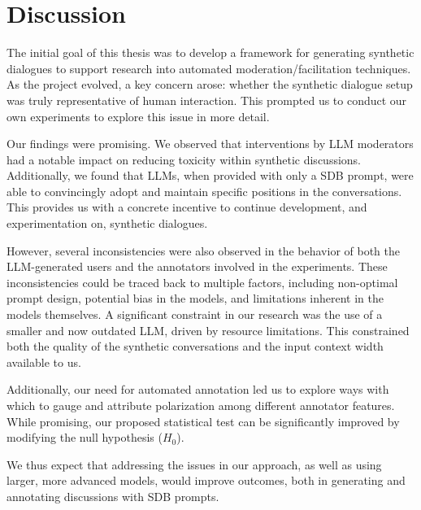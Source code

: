 %
\chapter{Discussion}
\label{sec:discusision}

The initial goal of this thesis was to develop a framework for generating synthetic dialogues to support research into automated moderation/facilitation techniques. As the project evolved, a key concern arose: whether the synthetic dialogue setup was truly representative of human interaction. This prompted us to conduct our own experiments to explore this issue in more detail.

Our findings were promising. We observed that interventions by LLM moderators had a notable impact on reducing toxicity within synthetic discussions. Additionally, we found that LLMs, when provided with only a \ac{SDB} prompt, were able to convincingly adopt and maintain specific positions in the conversations. This provides us with a concrete incentive to continue development, and experimentation on, synthetic dialogues.

However, several inconsistencies were also observed in the behavior of both the LLM-generated users and the annotators involved in the experiments. These inconsistencies could be traced back to multiple factors, including non-optimal prompt design, potential bias in the models, and limitations inherent in the models themselves. A significant constraint in our research was the use of a smaller and now outdated LLM, driven by resource limitations. This constrained both the quality of the synthetic conversations and the input context width available to us. 

Additionally, our need for automated annotation led us to explore ways with which to gauge and attribute polarization among different annotator features. While promising, our proposed statistical test can be significantly improved by modifying the null hypothesis ($H_0$).

We thus expect that addressing the issues in our approach, as well as using larger, more advanced models, would improve outcomes, both in generating and annotating discussions with \ac{SDB} prompts.